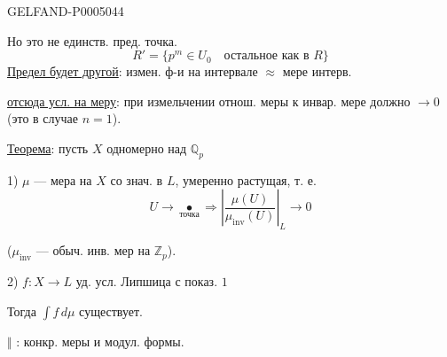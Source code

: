 \begin{GelfandAdjacentEvidence}{GELFAND-P000504}{4}


Но это не единств. пред. точка.
\[
R'=\{p^m\in U_0\quad\text{остальное как в }R\}
\]
\uline{Предел будет другой}: измен. ф-и на интервале $\approx$ мере интерв.

\uline{отсюда усл. на меру}: при измельчении отнош. меры к инвар. мере должно $\longrightarrow0$ (это в случае $n=1$).

\uline{Теорема}: пусть $X$ одномерно над $\mathbb Q_p$

1) $\mu$ — мера на $X$ со знач. в $L$, умеренно растущая,
т. е.
\[
U\longrightarrow\underset{\text{точка}}{\bullet}
\Longrightarrow
\left|\frac{\mu(U)}{\mu_{\mathrm{inv}}(U)}\right|_L\longrightarrow0
\]
\end{GelfandAdjacentEvidence}

($\mu_{\mathrm{inv}}$ — обыч. инв. мер на $\mathbb Z_p$).

2) $f:X\longrightarrow L$ уд. усл. Липшица с показ. $1$

Тогда $\int f\,d\mu$ существует.

\begin{flushright}
$\Vert$ : конкр. меры и модул. формы.
\end{flushright}


